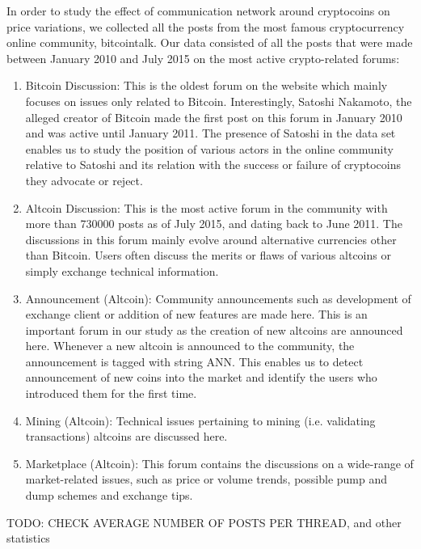 In order to study the effect of communication network around cryptocoins on
price variations, we collected all the posts from the most famous cryptocurrency
online community, bitcointalk.  Our data consisted of all the posts that were
made between January 2010 and July 2015 on the most active crypto-related forums:
\begin{enumerate}
  \item{Bitcoin Discussion:} This is the oldest forum on the website which mainly focuses
    on issues only related to Bitcoin. Interestingly, Satoshi Nakamoto, the alleged
    creator of Bitcoin made the first post on this forum in January 2010 and
    was active until January 2011. The presence of Satoshi in the data set enables us
    to study the position of various actors in the online community relative to Satoshi
    and its relation with the success or failure of cryptocoins they advocate or reject.

  \item{Altcoin Discussion:} This is the most active forum in the community
    with more than 730000 posts as of July 2015, and dating back to June 2011.
    The discussions in this forum mainly evolve around alternative currencies
    other than Bitcoin. Users often discuss the merits or flaws of various
    altcoins or simply exchange technical information.
  
  \item{Announcement (Altcoin):} Community announcements such as development of 
    exchange client or addition of new features are made here. This is an important forum
    in our study as the creation of new altcoins are announced here. Whenever a new
    altcoin is announced to the community, the announcement is tagged with string ANN.
    This enables us to detect announcement of new coins into the market and identify
    the users who introduced them for the first time.

  \item{Mining (Altcoin):} Technical issues pertaining to mining (i.e. validating transactions)
    altcoins are discussed here.
  \item{Marketplace (Altcoin):} This forum contains the discussions on a wide-range of 
    market-related issues, such as price or volume trends, possible pump and dump schemes
    and exchange tips.

\end{enumerate}
TODO: CHECK AVERAGE NUMBER OF POSTS PER THREAD, and other statistics


